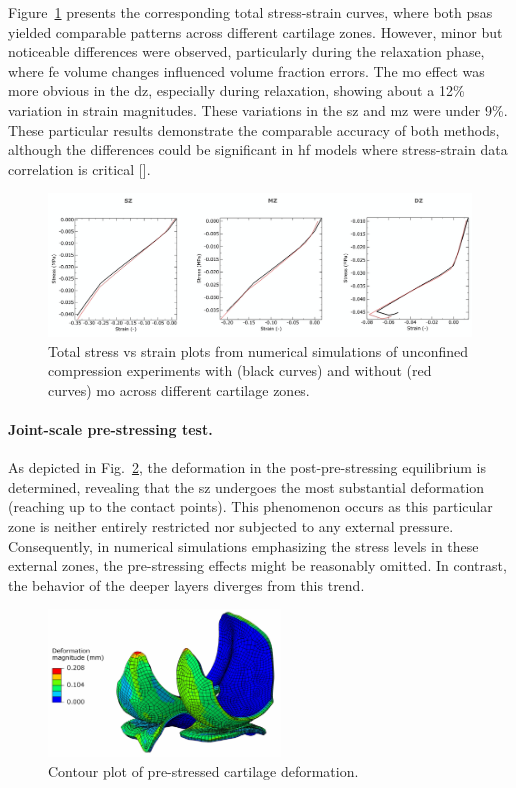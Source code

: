 Figure~\ref{fig:total_stress_strain} presents the corresponding total stress-strain curves, where both \acp{psa} yielded comparable patterns across different cartilage zones. However, minor but noticeable differences were observed, particularly during the relaxation phase, where \ac{fe} volume changes influenced volume fraction errors. The \ac{mo} effect was more obvious in the \ac{dz}, especially during relaxation, showing about a 12\% variation in strain magnitudes. These variations in the \ac{sz} and \ac{mz} were under 9\%. These particular results demonstrate the comparable accuracy of both methods, although the differences could be significant in \ac{hf} models where stress-strain data correlation is critical [\cite{eskelinen2019,liu2020,stender2016,hosseini2014}].
%
\begin{figure}
\includegraphics[width=\textwidth]{img/total_stress_strain.jpg}
\caption{Total stress vs strain plots from numerical simulations of unconfined compression experiments with (black curves) and without (red curves) \ac{mo} across different cartilage zones.}
\label{fig:total_stress_strain}
\end{figure}

\paragraph{Joint-scale pre-stressing test.} As depicted in Fig.~\ref{fig:deformation}, the deformation in the post-pre-stressing equilibrium is determined, revealing that the \ac{sz} undergoes the most substantial deformation (reaching up to the contact points). This phenomenon occurs as this particular zone is neither entirely restricted nor subjected to any external pressure. Consequently, in numerical simulations emphasizing the stress levels in these external zones, the pre-stressing effects might be reasonably omitted. In contrast, the behavior of the deeper layers diverges from this trend.
%
\begin{figure}\centering
\includegraphics[width=0.55\textwidth]{img/deformation.jpg}
\caption{Contour plot of pre-stressed cartilage deformation.}
\label{fig:deformation}
\end{figure}

